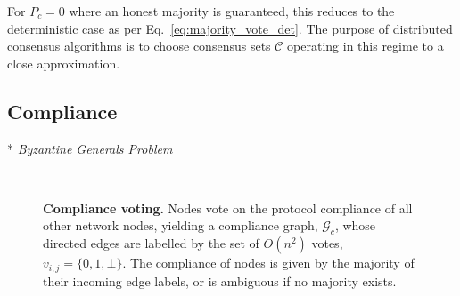 For \mbox{$P_c=0$} where an honest majority is guaranteed, this reduces to the deterministic case as per Eq.~\eqref{eq:majority_vote_det}. The purpose of distributed consensus algorithms is to choose consensus sets $\mathcal{C}$ operating in this regime to a close approximation.


\subsection{Compliance}

* \emph{Byzantine Generals Problem} \cite{Lamport82}

\begin{figure}[!htb]
	\centering
	\resizebox{0.4\columnwidth}{!}{} \\
	\vspace{-3.5em}
	\resizebox{0.32\columnwidth}{!}{}
	\resizebox{0.32\columnwidth}{!}{}
	\resizebox{0.32\columnwidth}{!}{}
	\caption{\textbf{Compliance voting.} Nodes vote on the protocol compliance of all other network nodes, yielding a compliance graph, $\mathcal{G}_c$, whose directed edges are labelled by the set of $O(n^2)$ votes, \mbox{$v_{i,j}=\{0,1,\bot\}$}. The compliance of nodes is given by the majority of their incoming edge labels, or is ambiguous if no majority exists.} \label{fig:compliance_voting}
\end{figure}